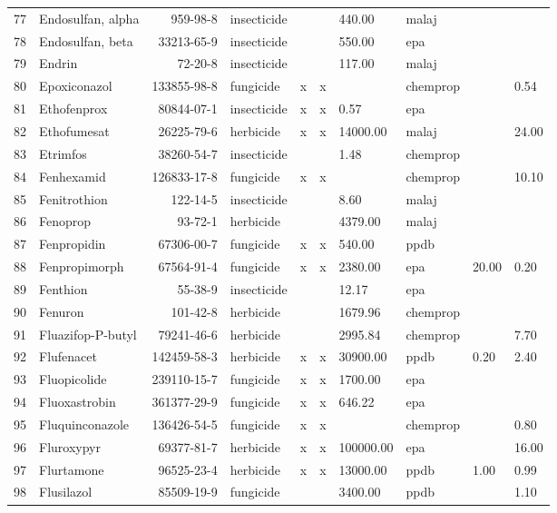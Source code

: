 \begin{longtable}{lp{3cm}rlp{0.5cm}p{0.5cm}p{1.5cm}p{1cm}p{1cm}p{1cm}}
  77 & Endosulfan, alpha & 959-98-8 & insecticide &  &  & 440.00 & malaj &  &  \\ 
  78 & Endosulfan, beta & 33213-65-9 & insecticide &  &  & 550.00 & epa &  &  \\ 
  79 & Endrin & 72-20-8 & insecticide &  &  & 117.00 & malaj &  &  \\ 
  80 & Epoxiconazol & 133855-98-8 & fungicide & x & x &  & chemprop &  & 0.54 \\ 
  81 & Ethofenprox & 80844-07-1 & insecticide & x & x & 0.57 & epa &  &  \\ 
  82 & Ethofumesat & 26225-79-6 & herbicide & x & x & 14000.00 & malaj &  & 24.00 \\ 
  83 & Etrimfos & 38260-54-7 & insecticide &  &  & 1.48 & chemprop &  &  \\ 
  84 & Fenhexamid & 126833-17-8 & fungicide & x & x &  & chemprop &  & 10.10 \\ 
  85 & Fenitrothion & 122-14-5 & insecticide &  &  & 8.60 & malaj &  &  \\ 
  86 & Fenoprop & 93-72-1 & herbicide &  &  & 4379.00 & malaj &  &  \\ 
  87 & Fenpropidin & 67306-00-7 & fungicide & x & x & 540.00 & ppdb &  &  \\ 
  88 & Fenpropimorph & 67564-91-4 & fungicide & x & x & 2380.00 & epa & 20.00 & 0.20 \\ 
  89 & Fenthion & 55-38-9 & insecticide &  &  & 12.17 & epa &  &  \\ 
  90 & Fenuron & 101-42-8 & herbicide &  &  & 1679.96 & chemprop &  &  \\ 
  91 & Fluazifop-P-butyl & 79241-46-6 & herbicide &  &  & 2995.84 & chemprop &  & 7.70 \\ 
  92 & Flufenacet & 142459-58-3 & herbicide & x & x & 30900.00 & ppdb & 0.20 & 2.40 \\ 
  93 & Fluopicolide & 239110-15-7 & fungicide & x & x & 1700.00 & epa &  &  \\ 
  94 & Fluoxastrobin & 361377-29-9 & fungicide & x & x & 646.22 & epa &  &  \\ 
  95 & Fluquinconazole & 136426-54-5 & fungicide & x & x &  & chemprop &  & 0.80 \\ 
  96 & Fluroxypyr & 69377-81-7 & herbicide & x & x & 100000.00 & epa &  & 16.00 \\ 
  97 & Flurtamone & 96525-23-4 & herbicide & x & x & 13000.00 & ppdb & 1.00 & 0.99 \\ 
  98 & Flusilazol & 85509-19-9 & fungicide &  &  & 3400.00 & ppdb &  & 1.10 \\ 

\end{longtable}
